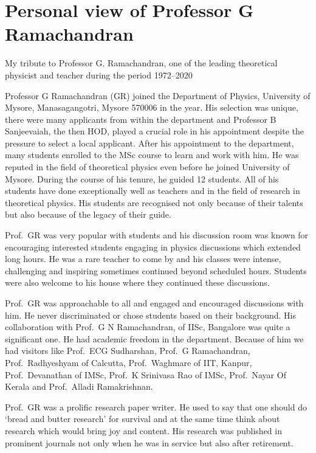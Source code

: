 \chapter{Personal view of Professor G Ramachandran}\label{chap19}


My tribute to Professor G. Ramachandran, one of the leading theoretical physicist and teacher during the period 1972--2020

Professor G Ramachandran (GR) joined the Department of Physics, University of Mysore, Manasagangotri, Mysore
570006 in the year. His selection was unique, there were many applicants from within the department
and Professor B Sanjeevaiah, the then HOD, played a crucial role in his appointment despite the pressure to
select a local applicant. After his appointment to the department, many students enrolled to the MSc course to
learn and work with him. He was reputed in the field of theoretical physics even before he joined University of
Mysore. During the course of his tenure, he guided 12 students. All of his students have done exceptionally well
as teachers and in the field of research in theoretical physics. His students are recognised not only because of
their talents but also because of the legacy of their guide.

Prof.\ GR was very popular with students and his discussion room was known for encouraging interested students
engaging in physics discussions which extended long hours. He was a rare teacher to come by and his classes were
intense, challenging and inspiring sometimes continued beyond scheduled hours. Students were also welcome to
his house where they continued these discussions.

Prof.\ GR was approachable to all and engaged and encouraged discussions with him. He never discriminated
or chose students based on their background. His collaboration with Prof.\ G N Ramachandran, of IISc, Bangalore was quite a significant one. He had academic freedom in the department. Because of him we had visitors like Prof.\ ECG Sudharshan, Prof.\ G Ramachandran, Prof.\ Radhyeshyam of Calcutta, Prof.\ Waghmare of IIT,
Kanpur, Prof.\ Devanathan of IMSc, Prof.\ K Srinivasa Rao of IMSc, Prof.\ Nayar Of Kerala and Prof.\ Alladi Ramakrishnan.

Prof.\ GR was a prolific research paper writer. He used to say that one should do `bread and butter research' for survival and at the same time think about research which would bring joy and content. His research was published in prominent journals not only when he was in service but also after retirement.

